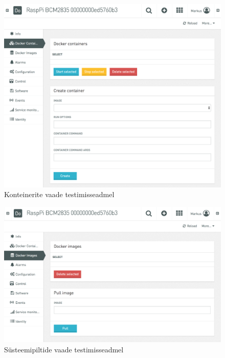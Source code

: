 \documentclass[12pt]{article}
\begin{document}
  \begin{figure} [ht] %
  \begin{center}
  \includegraphics[width=1.0\textwidth]{test_nocontainers}
  \caption{Konteinerite vaade testimisseadmel}
  \label{fig:test_nocontainers}
  \end{center}
  \end{figure}
 
  \FloatBarrier
  
  \begin{figure} [ht] %
  \begin{center}
  \includegraphics[width=1.0\textwidth]{test_noimages}
  \caption{Süsteemipiltide vaade testimisseadmel}
  \label{fig:test_noimages}
  \end{center}
  \end{figure}
 
\end{document}
